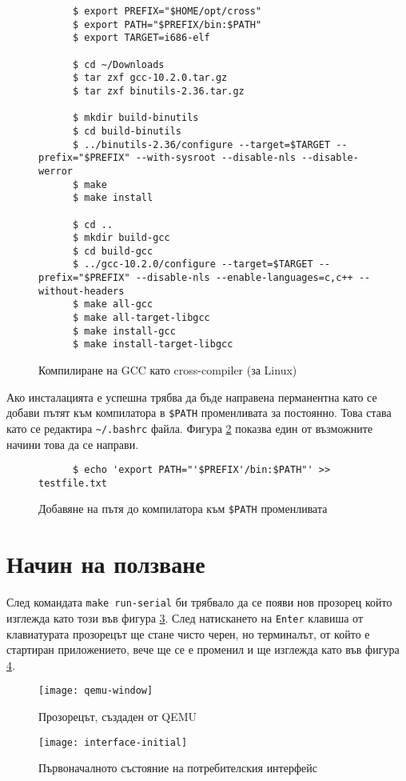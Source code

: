   \begin{figure}[htpb]
    \centering
    \begin{verbatim}
      $ export PREFIX="$HOME/opt/cross"
      $ export PATH="$PREFIX/bin:$PATH"
      $ export TARGET=i686-elf

      $ cd ~/Downloads
      $ tar zxf gcc-10.2.0.tar.gz
      $ tar zxf binutils-2.36.tar.gz

      $ mkdir build-binutils
      $ cd build-binutils
      $ ../binutils-2.36/configure --target=$TARGET --prefix="$PREFIX" --with-sysroot --disable-nls --disable-werror
      $ make
      $ make install

      $ cd ..
      $ mkdir build-gcc
      $ cd build-gcc
      $ ../gcc-10.2.0/configure --target=$TARGET --prefix="$PREFIX" --disable-nls --enable-languages=c,c++ --without-headers
      $ make all-gcc
      $ make all-target-libgcc
      $ make install-gcc
      $ make install-target-libgcc
    \end{verbatim}
    \caption{Компилиране на GCC като cross-compiler (за Linux)}
    \label{fig:compiling-gcc}
  \end{figure}

  Ако инсталацията е успешна трябва да бъде направена перманентна като се добави пътят към компилатора в {\tt \$PATH} променливата за постоянно. Това става като се редактира {\tt \~{}/.bashrc} файла. Фигура \ref{fig:adding-to-path} показва един от възможните начини това да се направи.

  \begin{figure}[htpb]
    \centering
    \begin{verbatim}
      $ echo 'export PATH="'$PREFIX'/bin:$PATH"' >> testfile.txt
    \end{verbatim}
    \caption{Добавяне на пътя до компилатора към {\tt \$PATH} променливата}
    \label{fig:adding-to-path}
  \end{figure}

  \section{Начин на ползване}
  След командата {\tt make run-serial} би трябвало да се появи нов прозорец който изглежда като този във фигура \ref{fig:qemu-window}. След натискането на {\tt Enter} клавиша от клавиатурата прозорецът ще стане чисто черен, но терминалът, от който е стартиран приложението, вече ще се е променил и ще изглежда като във фигура \ref{fig:interface-initial}.

  \begin{figure}[htpb]
    \centering
    \texttt{[image: qemu-window]}
    \caption{Прозорецът, създаден от QEMU}
    \label{fig:qemu-window}
  \end{figure}

  \begin{figure}[htpb]
    \centering
    \texttt{[image: interface-initial]}
    \caption{Първоначалното състояние на потребителския интерфейс}
    \label{fig:interface-initial}
  \end{figure}

